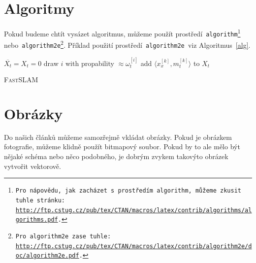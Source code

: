 \documentclass[a4paper,11pt]{article}[20-03-2022]
\begin{document}
\section{Algoritmy}
\label{sec3}
Pokud budeme chtít vysázet algoritmus, můžeme použít prostředí\texttt{ algorithm\footnote{Pro nápovědu, jak zacházet s prostředím\texttt{ algorithm,} můžeme zkusit tuhle stránku:\\\url{http://ftp.cstug.cz/pub/tex/CTAN/macros/latex/contrib/algorithms/algorithms.pdf}.} } nebo\texttt{ algorithm2e\footnote{Pro\texttt{ algorithm2e }zase tuhle: \url{http://ftp.cstug.cz/pub/tex/CTAN/macros/latex/contrib/algorithm2e/doc/algorithm2e.pdf}.}}. 
Příklad použití prostředí\texttt{ algorithm2e }viz Algoritmus~\ref{alg}.
\bigskip
\IncMargin{1.5em}
\begin{algorithm}
    \label{alg}
    \DontPrintSemicolon

    \Indm\Indmm
    \Indp\Indpp
    \BlankLine
    $\overline{X_t} = X_t = 0$\;
     {
        draw $i$ with propability $\approx \omega_t^{[i]}$\;
        add $\langle x_x^{[k]}, m_t^{[k]} \rangle$ to $X_t$\;
    }
    \caption{\textsc{FastSLAM}}
\end{algorithm}

\section{Obrázky}
Do našich článků můžeme samozřejmě vkládat obrázky. Pokud je obrázkem fotografie, můžeme klidně použít bitmapový soubor. 
Pokud by to ale mělo být nějaké schéma nebo něco podobného, je dobrým zvykem takovýto obrázek vytvořit vektorově.
\end{document}
